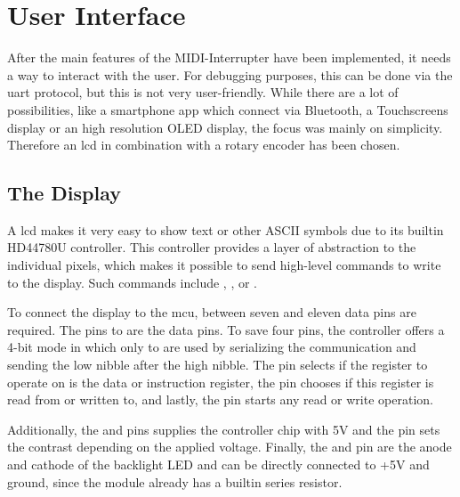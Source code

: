 \setchapterpreamble[u]{\margintoc}

\chapter{User Interface}
\label{ch:user-interface}

After the main features of the MIDI-Interrupter have been implemented, it needs a way to interact with the user. For debugging purposes, this can be done via the \gls{uart} protocol, but this is not very user-friendly. While there are a lot of possibilities, like a smartphone app which connect via Bluetooth, a Touchscreens display or an high resolution OLED display, the focus was mainly on simplicity. Therefore an \gls{lcd} in combination with a rotary encoder has been chosen.

\section{The Display}

A \gls{lcd} makes it very easy to show text or other ASCII symbols due to its builtin HD44780U controller. This controller provides a layer of abstraction to the individual pixels, which makes it possible to send high-level commands to write to the display. Such commands include , , or .

To connect the display to the \gls{mcu}, between seven and eleven data pins are required. The pins  to  are the data pins. To save four pins, the controller offers a 4-bit mode in which only  to  are used by serializing the communication and sending the low \gls{nibble} after the high \gls{nibble}. The  pin selects if the register to operate on is the data or instruction register, the  pin chooses if this register is read from or written to, and lastly, the  pin starts any read or write operation.

Additionally, the  and  pins supplies the controller chip with 5V and the  pin sets the contrast depending on the applied voltage. Finally, the  and  pin are the anode and cathode of the backlight LED and can be directly connected to +5V and ground, since the module already has a builtin series resistor.

